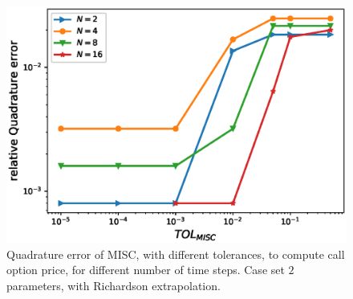 \begin{figure}[h!]
	\centering
	\includegraphics[width=0.35\linewidth]{./figures/rBergomi_MISC_quadratre_error/vs_TOL/set5/relative_quad_error_wrt_MISC_TOL_set5_with_rich}
	
	
	\caption{Quadrature error of MISC, with  different tolerances,  to compute call option price, for different number of time steps. Case  set $2$ parameters, with Richardson extrapolation.}
	\label{fig:Quadrature_error_set3_rich}
\end{figure}
\FloatBarrier
